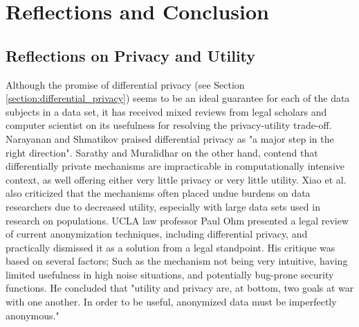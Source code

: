 
\chapter{Reflections and Conclusion}

\section{Reflections on Privacy and Utility } \label{sec:privacy_utility_reflection}

Although the promise of differential privacy (see Section \ref{section:differential_privacy}) seems to be an ideal guarantee for each of the data subjects in a data set, it has received mixed reviews from legal scholars and computer scientist on its usefulness for resolving the privacy-utility trade-off. Narayanan and Shmatikov praised differential privacy as "a major step in the right direction\citep{narayanan2010myths}". Sarathy and Muralidhar on the other hand, contend that differentially private mechanisms are impracticable in computationally intensive context, as well offering either very little privacy or very little utility\citep{Sarathy2011evaluating}. Xiao et al. also criticized that the mechanisms often placed undue burdens on data researchers due to decreased utility, especially with large data sets used in research on populations\citep{xiao2011differential}. UCLA law professor Paul Ohm presented a legal review of current anonymization techniques, including differential privacy, and practically dismissed it as a solution from a legal standpoint. His critique was based on several factors; Such as the mechanism not being very intuitive, having limited usefulness in high noise situations, and potentially bug-prone security functions. He concluded that "utility and privacy are, at bottom, two goals at war with one another. In order to be useful, anonymized data must be imperfectly anonymous\citep{ohm2010brokenPrivacyPromise}."

